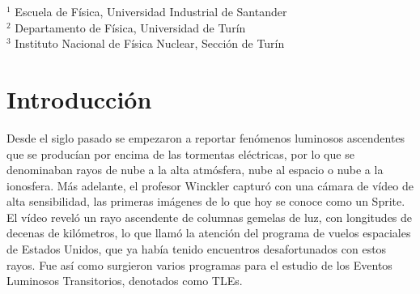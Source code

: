 \documentclass[12pt,oneside,openany,letter]{book}
\begin{document}
\begin{titlepage}



\vfill


\vfill




\vfill

$^{1}$  Escuela de F\'isica, Universidad Industrial de Santander \\
$^{2}$ Departamento de F\'isica, Universidad de Tur\'in
\\
$^{3}$ Instituto Nacional de F\'isica Nuclear,  Secci\'on de Tur\'in\\
\vfill

\end{titlepage}

\tableofcontents
\listoffigures


\chapter*{Introducci\'on}\label{introduccion}
Desde el siglo pasado se empezaron a reportar fen\'omenos luminosos ascendentes que se produc\'ian por encima de las tormentas el\'ectricas, por lo que se denominaban rayos de nube a la alta atmósfera, nube al espacio o nube a la ionosfera. M\'as adelante, el profesor Winckler \cite{FranzEtal1990} captur\'o con una c\'amara de v\'ideo de alta sensibilidad, las primeras im\'agenes de lo que hoy se conoce como un Sprite. El v\'ideo revel\'o un rayo ascendente de columnas gemelas de luz, con longitudes de decenas de kil\'ometros, lo que llam\'o la atenci\'on del programa de vuelos espaciales de Estados Unidos, que ya hab\'ia tenido encuentros desafortunados con estos rayos. Fue as\'i como surgieron varios programas para el estudio de los Eventos Luminosos Transitorios, denotados como TLEs. 
\end{document}
